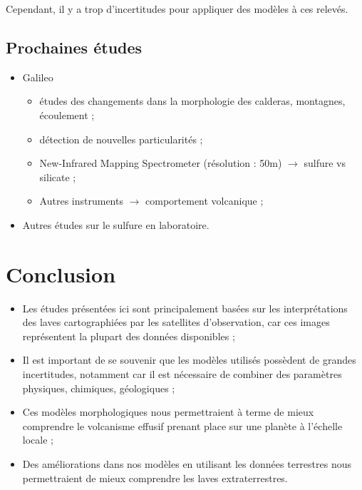\documentclass[10pt,a4paper, twocolumns]{article}
\begin{document}
	Cependant, il y a trop d'incertitudes pour appliquer des modèles à ces relevés.

\subsection{Prochaines études}
	
	\begin{itemize}
		\item Galileo
		\begin{itemize}
			\item études des changements dans la morphologie des calderas, montagnes, écoulement ;
			\item détection de nouvelles particularités ;
			\item New-Infrared Mapping Spectrometer (résolution : 50m) $\rightarrow$ sulfure vs silicate ;
			\item Autres instruments $\rightarrow$ comportement volcanique ;
		\end{itemize}
		\item Autres études sur le sulfure en laboratoire.
	\end{itemize}

\section{Conclusion}

\begin{itemize}
	\item Les études présentées ici sont principalement basées sur les interprétations des laves cartographiées par les satellites d'observation, car ces images représentent la plupart des données disponibles ;
	\item Il est important de se souvenir que les modèles utilisés possèdent de grandes incertitudes, notamment car il est nécessaire de combiner des paramètres physiques, chimiques, géologiques ;
	\item Ces modèles morphologiques nous permettraient à terme de mieux comprendre le volcanisme effusif prenant place sur une planète à l'échelle locale ;
	\item Des améliorations dans nos modèles en utilisant les données terrestres nous permettraient de mieux comprendre les laves extraterrestres.
\end{itemize}
\end{document}
